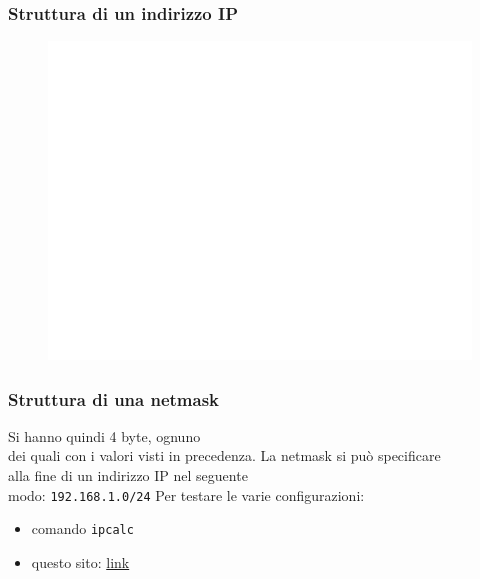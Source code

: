 \documentclass[aspectratio=169]{beamer}
\begin{document}
    \begin{frame}
        \frametitle{Struttura di un indirizzo IP}
        \begin{figure}
            \centering
            \includegraphics[width= 0.68\linewidth]{img/networkid.png}
        \end{figure}
    \end{frame}
    
    \begin{frame}
        \frametitle{Struttura di una netmask}
        
        Si hanno quindi 4 byte, ognuno\\dei quali con i valori visti in precedenza.\vskip 0.3cm
        La netmask si può specificare\\alla fine di un indirizzo IP nel seguente\\modo:
        \texttt{192.168.1.0/24}\vskip 0.3cm
        Per testare le varie configurazioni:
        \begin{itemize}
            \item comando \texttt{ipcalc}
            \item questo sito: \href{http://jodies.de/ipcalc}{link}
        \end{itemize}
        
    \end{frame}
    
\end{document}
